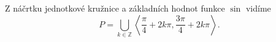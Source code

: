 \begin{reseni}
	Z náčrtku jednotkové kružnice a základních hodnot funkce $\sin$ vidíme
	$$P = \bigcup\limits_{k \in \mathbb Z} \left<\frac{\pi}{4}+ 2k\pi,\frac{3\pi}{4}+ 2k\pi \right>.$$

\end{reseni}
